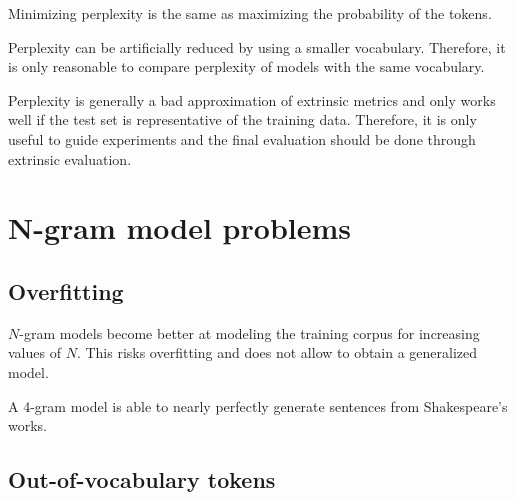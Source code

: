 \begin{description}
        \begin{remark}
            Minimizing perplexity is the same as maximizing the probability of the tokens.
        \end{remark}

        \begin{remark}
            Perplexity can be artificially reduced by using a smaller vocabulary. Therefore, it is only reasonable to compare perplexity of models with the same vocabulary.
        \end{remark}

        \begin{remark}
            Perplexity is generally a bad approximation of extrinsic metrics and only works well if the test set is representative of the training data. Therefore, it is only useful to guide experiments and the final evaluation should be done through extrinsic evaluation.
        \end{remark}
\end{description}



\section{$\mathbf{N}$-gram model problems}


\subsection{Overfitting}

$N$-gram models become better at modeling the training corpus for increasing values of $N$. This risks overfitting and does not allow to obtain a generalized model.

\begin{example}
    A 4-gram model is able to nearly perfectly generate sentences from Shakespeare's works.
\end{example}


\subsection{Out-of-vocabulary tokens}

